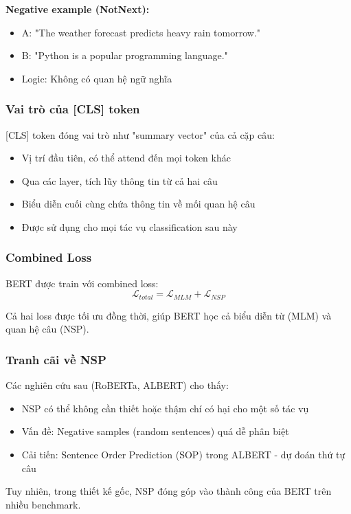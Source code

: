 \textbf{Negative example (NotNext):}
\begin{itemize}
    \item A: "The weather forecast predicts heavy rain tomorrow."
    \item B: "Python is a popular programming language."
    \item Logic: Không có quan hệ ngữ nghĩa
\end{itemize}

\subsubsection{Vai trò của [CLS] token}
[CLS] token đóng vai trò như "summary vector" của cả cặp câu:
\begin{itemize}
    \item Vị trí đầu tiên, có thể attend đến mọi token khác
    \item Qua các layer, tích lũy thông tin từ cả hai câu
    \item Biểu diễn cuối cùng chứa thông tin về mối quan hệ câu
    \item Được sử dụng cho mọi tác vụ classification sau này
\end{itemize}

\subsubsection{Combined Loss}
BERT được train với combined loss:
$$ \mathcal{L}_{total} = \mathcal{L}_{MLM} + \mathcal{L}_{NSP} $$

Cả hai loss được tối ưu đồng thời, giúp BERT học cả biểu diễn từ (MLM) và quan hệ câu (NSP).

\subsubsection{Tranh cãi về NSP}
Các nghiên cứu sau (RoBERTa, ALBERT) cho thấy:
\begin{itemize}
    \item NSP có thể không cần thiết hoặc thậm chí có hại cho một số tác vụ
    \item Vấn đề: Negative samples (random sentences) quá dễ phân biệt
    \item Cải tiến: Sentence Order Prediction (SOP) trong ALBERT - dự đoán thứ tự câu
\end{itemize}

Tuy nhiên, trong thiết kế gốc, NSP đóng góp vào thành công của BERT trên nhiều benchmark.

